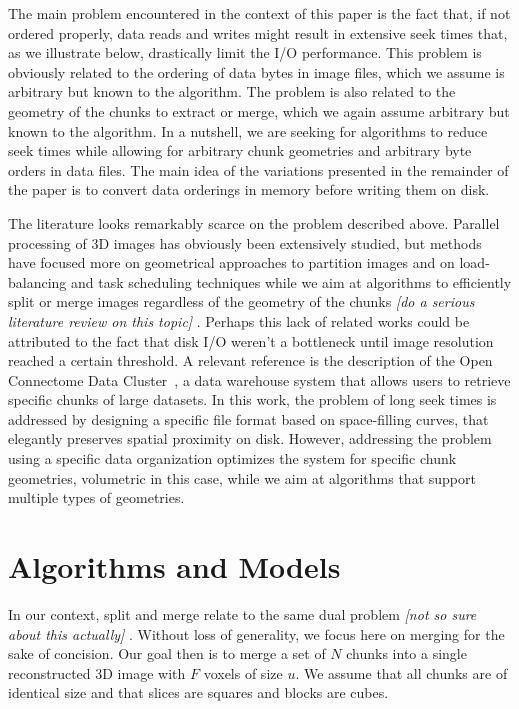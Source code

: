 \documentclass[10pt, conference, compsocconf]{IEEEtran}
\newcommand{\todo}[1]{
  \color{red}\emph{[#1]}
  \color{black}
}
\begin{document}
The main problem encountered in the context of this paper is the fact
that, if not ordered properly, data reads and writes might result in
extensive seek times that, as we illustrate below, drastically limit
the I/O performance. This problem is obviously related to the ordering
of data bytes in image files, which we assume is arbitrary but known
to the algorithm. The problem is also related to the geometry of the
chunks to extract or merge, which we again assume arbitrary but known
to the algorithm. In a nutshell, we are seeking for algorithms to
reduce seek times while allowing for arbitrary chunk geometries and
arbitrary byte orders in data files. The main idea of the variations
presented in the remainder of the paper is to convert data orderings
in memory before writing them on disk. 

The literature looks remarkably scarce on the problem described
above. Parallel processing of 3D images has obviously been extensively
studied, but methods have focused more on geometrical approaches to
partition images and on load-balancing and task scheduling techniques
while we aim at algorithms to efficiently split or merge images
regardless of the geometry of the chunks \todo{do a serious literature
review on this topic}. Perhaps this lack of related works could be
attributed to the fact that disk I/O weren't a bottleneck until image
resolution reached a certain threshold. A relevant reference is the
description of the Open Connectome Data Cluster~\cite{burns2013open},
a data warehouse system that allows users to retrieve specific chunks
of large datasets. In this work, the problem of long seek times is
addressed by designing a specific file format based on space-filling
curves, that elegantly preserves spatial proximity on disk. However,
addressing the problem using a specific data organization optimizes
the system for specific chunk geometries, volumetric in this case,
while we aim at algorithms that support multiple types of geometries.


\section{Algorithms and Models}

In our context, split and merge relate to the same dual
problem \todo{not so sure about this actually}. Without loss of
generality, we focus here on merging for the sake of concision. Our
goal then is to merge a set of $N$ chunks into a single reconstructed
3D image with $F$ voxels of size $u$. We assume that all chunks are of
identical size and that slices are squares and blocks are cubes.
\end{document}
